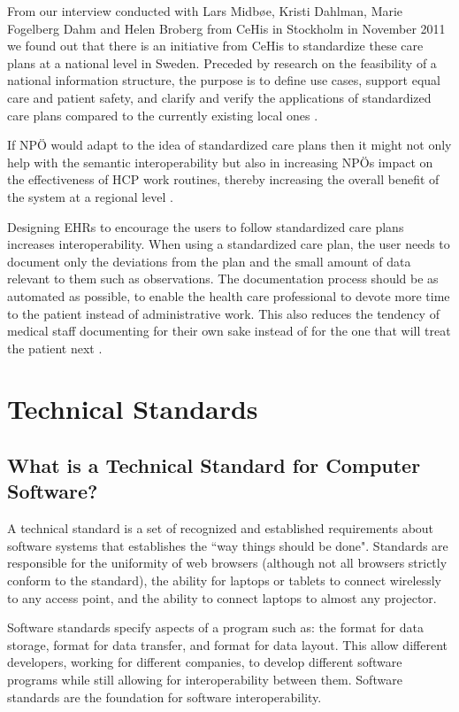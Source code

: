 \documentclass[14pt]{article}
\begin{document}
From our interview conducted with Lars Midbøe, Kristi Dahlman, Marie Fogelberg Dahm and Helen Broberg from \gls{CeHis} in Stockholm in November 2011 we found out that there is an initiative from \gls{CeHis} to standardize these care plans at a national level in Sweden. Preceded by research on the feasibility of a national information structure, the purpose is to define use cases, support equal care and patient safety, and clarify and verify the applications of standardized care plans compared to the currently existing local ones \cite{CeHis}.

If NPÖ would adapt to the idea of standardized care plans then it might not only help with the semantic interoperability but also in increasing NPÖs impact on the effectiveness of HCP work routines, thereby increasing the overall benefit of the system at a regional level \cite{Cambio}.

Designing \glspl{EHR} to encourage the users to follow standardized care plans increases interoperability. When using a standardized care plan, the user needs to document only the deviations from the plan and the small amount of data relevant to them such as observations. The documentation process should be as automated as possible, to enable the health care professional to devote more time to the patient instead of administrative work. This also reduces the tendency of medical staff documenting for their own sake instead of for the one that will treat the patient next \cite{Cambio}.

\newpage

\section{Technical Standards}
\label{sec:TechnicalStandards}

\subsection{What is a Technical Standard for Computer Software?}
\label{sec:technicalStandardsWhatIs}
A technical standard is a set of recognized and established requirements about software systems that establishes the ``way things should be done". Standards are responsible for the uniformity of web browsers (although not all browsers strictly conform to the standard), the ability for laptops or tablets to connect wirelessly to any access point, and the ability to connect laptops to almost any projector.

Software standards specify aspects of a program such as: the format for data storage, format for data transfer, and format for data layout. This allow different developers, working for different companies, to develop different software programs while still allowing for \gls{interoperability} between them. Software standards are the foundation for software \gls{interoperability}.
\end{document}
